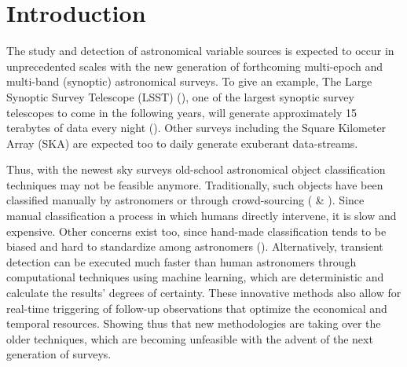 \documentclass[a4paper,fleqn,usenatbib]{mnras}
\begin{document}

\section{Introduction}

The study and detection of astronomical variable sources is expected to occur in unprecedented scales with the new generation of forthcoming multi-epoch and multi-band (synoptic) astronomical surveys. To give an example, The Large Synoptic Survey Telescope (LSST) (\cite{0805.2366}), one of the largest synoptic survey telescopes to come in the following years, will generate approximately 15 terabytes of data every night (\cite{1512.07914}). 
Other surveys including the Square Kilometer Array (SKA) are expected too to daily generate exuberant data-streams.

Thus, with the newest sky surveys old-school astronomical object classification techniques may not be feasible anymore. Traditionally, such objects have been classified manually by astronomers or through crowd-sourcing (\cite{1011.2199} \& \cite{0708.2750}). Since manual classification a process in which humans directly intervene, it is slow and expensive. Other concerns exist too, since hand-made classification tends to be biased and hard to standardize among astronomers (\cite{1104.3142}). Alternatively, transient detection can be executed much faster than human astronomers through computational techniques using machine learning, which are deterministic and calculate the results' degrees of certainty. These innovative methods also allow for real-time triggering of follow-up observations that optimize the economical and temporal resources. Showing thus that new methodologies are taking over the older techniques, which are becoming unfeasible with the advent of the next generation of surveys. 
\end{document}
